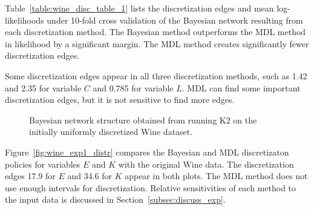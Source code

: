 \documentclass[twoside,11pt]{article}
\begin{document}
Table~\ref{table:wine_disc_table_1} lists the discretization edges and mean log-likelihoods under \num{10}-fold cross validation of the Bayesian network resulting from each discretization method.
The Bayesian method outperforms the MDL method in likelihood by a significant margin.
The MDL method creates significantly fewer discretization edges.

Some discretization edges appear in all three discretization methods, such as \num{1.42} and \num{2.35} for variable $C$ and \num{0.785} for variable $L$. MDL can find some important discretization edges, but it is not sensitive to find more edges.

\begin{figure}[ht]
  \centering
  \scalebox{0.8}{}
  \caption{Bayesian network structure obtained from running K2 on the initially uniformly discretized Wine dataset.}
  \label{fig:wine_graph_1}
\end{figure}

\begin{table}
  \centering
  \caption{
    Results from discretization of the Wine MPG dataset with fixed structure.
    Bold discretization edges were identified by both methods.
  }
  \scalebox{1.0}{
  
  }
  \label{table:wine_disc_table_1}
\end{table}

Figure~\ref{fig:wine_exp1_distr} compares the Bayesian and MDL discretizaton policies for variables $E$ and $K$ with the original Wine data.
The discretization edges \num{17.9} for $E$ and \num{34.6} for $K$ appear in both plots.
The MDL method does not use enough intervals for discretization.
Relative sensitivities of each method to the input data is discussed in Section~\ref{subsec:discuss_exp}.
\end{document}
